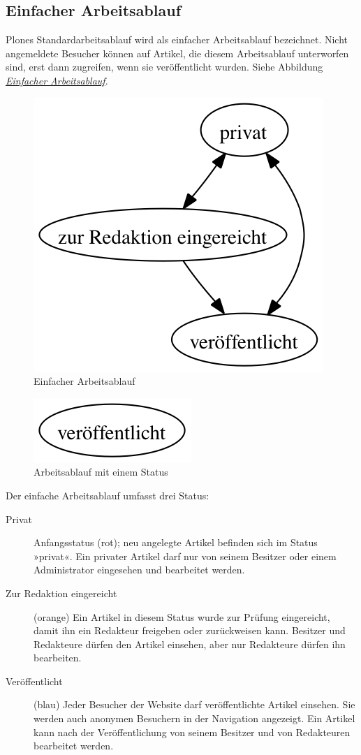 \documentclass[a4paper,12pt,ngerman]{manual}
\begin{document}
\subsection{Einfacher Arbeitsablauf}

Plones Standardarbeitsablauf wird als einfacher Arbeitsablauf
bezeichnet.  Nicht angemeldete Besucher können auf Artikel, die diesem
Arbeitsablauf unterworfen sind, erst dann zugreifen, wenn sie
veröffentlicht wurden. Siehe Abbildung \hyperlink{fig-workflow-einfach}{\emph{Einfacher Arbeitsablauf}}.
\hypertarget{fig-workflow-einfach}{}\begin{figure}[htbp]
\centering

\includegraphics[width=0.300\linewidth]{workflow-einfach.png}
\caption{Einfacher Arbeitsablauf}\end{figure}
\hypertarget{fig-workflow-ein-status}{}\begin{figure}[htbp]
\centering

\includegraphics[width=0.200\linewidth]{workflow-ein-status.png}
\caption{Arbeitsablauf mit einem Status}\end{figure}

Der einfache Arbeitsablauf umfasst drei Status:
\begin{description}
\item[Privat] \leavevmode
Anfangsstatus (rot); neu angelegte Artikel befinden sich im Status
»privat«. Ein privater Artikel darf nur von seinem Besitzer oder einem
Administrator eingesehen und bearbeitet werden.

\item[Zur Redaktion eingereicht] \leavevmode
(orange) Ein Artikel in diesem Status wurde zur Prüfung eingereicht,
damit ihn ein Redakteur freigeben oder zurückweisen kann. Besitzer
und Redakteure dürfen den Artikel einsehen, aber nur Redakteure
dürfen ihn bearbeiten.

\item[Veröffentlicht] \leavevmode
(blau) Jeder Besucher der Website darf veröffentlichte
Artikel einsehen. Sie werden auch anonymen Besuchern in der
Navigation angezeigt. Ein Artikel kann nach der Veröffentlichung von
seinem Besitzer und von Redakteuren bearbeitet werden.

\end{description}
\end{document}
